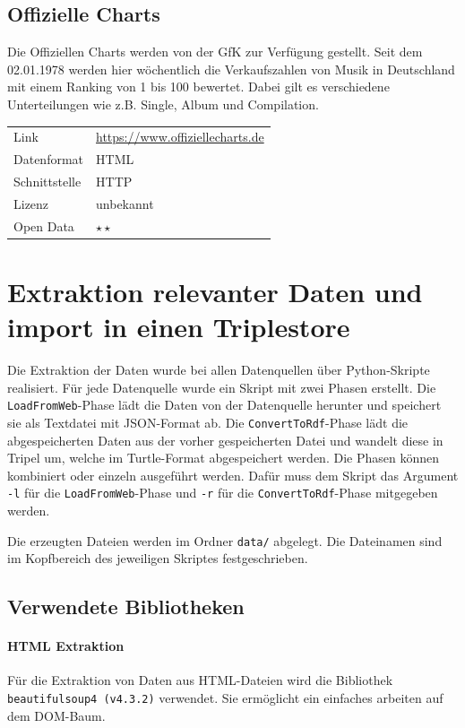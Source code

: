\documentclass[parskip]{scrartcl}
\begin{document}
\subsection{Offizielle Charts}

Die Offiziellen Charts werden von der GfK zur Verfügung gestellt. Seit dem 02.01.1978 werden hier wöchentlich die Verkaufszahlen von Musik in Deutschland mit einem Ranking von 1 bis 100 bewertet. Dabei gilt es verschiedene Unterteilungen wie z.B. Single, Album und Compilation.

\begin{tabular}{l|p{9cm}}
    Link & \url{https://www.offiziellecharts.de} \\
    Datenformat & HTML \\
    Schnittstelle & HTTP \\
    Lizenz & unbekannt \\
    Open Data & $\star\star$ \\
\end{tabular}

\section{Extraktion relevanter Daten und import in einen Triplestore }

Die Extraktion der Daten wurde bei allen Datenquellen über Python-Skripte realisiert. Für jede Datenquelle wurde ein Skript mit zwei Phasen erstellt. Die \texttt{LoadFromWeb}-Phase lädt die Daten von der Datenquelle herunter und speichert sie als Textdatei mit JSON-Format ab. Die \texttt{ConvertToRdf}-Phase lädt die abgespeicherten Daten aus der vorher gespeicherten Datei und wandelt diese in Tripel um, welche im Turtle-Format abgespeichert werden. Die Phasen können kombiniert oder einzeln ausgeführt werden. Dafür muss dem Skript das Argument \texttt{-l} für die \texttt{LoadFromWeb}-Phase und \texttt{-r} für die \texttt{ConvertToRdf}-Phase mitgegeben werden.

Die erzeugten Dateien werden im Ordner \texttt{data/} abgelegt. Die Dateinamen sind im Kopfbereich des jeweiligen Skriptes festgeschrieben.


\subsection{Verwendete Bibliotheken}

\paragraph{HTML Extraktion}
Für die Extraktion von Daten aus HTML-Dateien wird die Bibliothek \texttt{beautifulsoup4  (v4.3.2)} verwendet. Sie ermöglicht ein einfaches arbeiten auf dem DOM-Baum.
\end{document}
